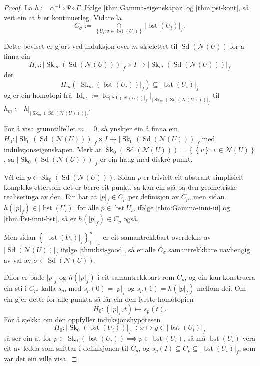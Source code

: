 \documentclass[a4paper, 12pt, norsk]{article}
\theoremstyle{plain}
\theoremstyle{definition}
\newcommand{\Nc}{\mathcal{N}}
\newcommand{\intersect}{ \mathop{\cap}\limits }
\newcommand{\gr}[1]{ \lvert #1 \rvert } %
\newcommand{\set}[1]{ \left\{ #1 \right\} } %
\DeclareMathOperator{\Sd}{Sd} %
\DeclareMathOperator{\bst}{bst} %
\DeclareMathOperator{\Sk}{Sk} %
\DeclareMathOperator{\Id}{Id} %
\begin{document}
\begin{proof}
	La \( h := \alpha^{-1} \circ \Psi \circ \Gamma \). Ifølge \autoref{thm:Gamma-eigenskapar} og \autoref{thm:psi-kont}, så veit ein at \( h \) er kontinuerleg. Vidare la 
	\[ 
		C_\sigma := \intersect_{\set{ U_i : \sigma \in \bst(U_i) }} \gr{\bst(U_i)}_f.
	\]

	Dette beviset er gjort ved induksjon over \( m \)-skjelettet til \( \Sd(\Nc(U)) \) for å finna ein 
	\[ 
		H_m : \gr{\Sk_m(\Sd(\Nc(U)))}_f \times I \to \gr{\Sk_m(\Sd(\Nc(U)))}_f
	\]
	der 
	\[
		H_m(\gr{\Sk_m(\bst(U_i))}_f) \subseteq \gr{\bst(U_i)}_f
	\]
	og er ein homotopi frå \( \Id_m := \Id_{\gr{\Sd(\Nc(U))}_f}|_{\gr{\Sk_m(\Sd(\Nc(U)))}_f} \) til \( h_m := h|_{\gr{\Sk_m(\Sd(\Nc(U)))}_f} \).

	For å visa grunntilfellet \( m = 0 \), så ynskjer ein å finna ein \( H_0: \gr{\Sk_0(\Sd(\Nc(U)))}_f \times I \to \gr{\Sk_0(\Sd(\Nc(U)))}_f \) med induksjonseigenskapen. Merk at \( \Sk_0(\Sd(\Nc(U))) = \set{\set{v} : v \in \Nc(U)} \), så \( \gr{\Sk_0(\Sd(\Nc(U)))}_f \) er ein haug med diskré punkt.

	Vél ein \( p \in \Sk_0(\Sd(\Nc(U))) \). Sidan \( p \) er trivielt eit abstrakt simplisielt kompleks ettersom det er berre eit punkt, så kan ein sjå på den geometriske realiseringa av den. Ein har at \( \gr{p}_f \in C_p \) per definisjon av \( C_p \), men sidan \( h(\gr{p}_f) \in \gr{\bst(U_i)} \) for alle \( p \in \bst{U_i} \), ifølge \autoref{thm:Gamma-inni-ui} og \autoref{thm:Psi-inni-bst}, så er \( h(\gr{p}_f) \in C_p \) også.

	Men sidan \( \set{\gr{\bst(U_i)}_f}_{i = 1}^{n} \) er eit samantrekkbart overdekke av \( \gr{\Sd(\Nc(U))}_f \) ifølge \autoref{thm:bst-good}, så er alle \( C_\sigma \) samantrekkbare uavhengig av val av \( \sigma \in \Sd(\Nc(U)) \).

	Difor er både \( \gr{p}_f \) og \( h(\gr{p}_f) \) i eit samantrekkbart rom \( C_p \), og ein kan konstruera ein sti i \( C_p \), kalla \( s_p \), med \( s_p(0) = \gr{p}_f \) og \( s_p(1) = h(\gr{p}_f) \) mellom dei. Om ein gjer dette for alle punkta så får ein den fyrste homotopien
	\[
		H_0 : (\gr{p}_f, t) \mapsto s_p(t).
	\]
	For å sjekka om den oppfyller induksjonshypotesen
	\[
		H_0: \gr{\Sk_0(\bst(U_i))}_f \ni x \mapsto y \in \gr{\bst(U_i)}_f
	\]
	så ser ein at for \( p \in \Sk_0(\bst(U_i)) \implies p \in \bst(U_i) \), så må \( \bst(U_i) \) vera eit av ledda som snittar i definisjonen til \( C_p \), og \( s_p(I) \subseteq C_p \subseteq \gr{\bst(U_i)}_f \), som var det ein ville visa.


\end{proof}
\end{document}
